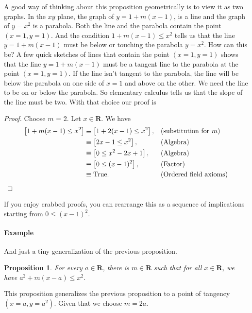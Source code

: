 \documentclass[12pt,fleqn]{article}
\newcommand{\reals}{\mathbf{R}}
\newcommand{\true}{\mathrm{True}}
\newenvironment{myproof}
  {\begin{shaded}\begin{proof}}
  {\end{proof}\end{shaded}}
\newtheorem{prop}{Proposition}
\newcounter{ex}\setcounter{ex}{0}
\newcommand{\ex}{%
\setcounter{ex}{\value{ex}+1}
\paragraph{Example \theex}}
\begin{document}
      A good way of thinking about this proposition geometrically is to view it as two graphs. In the $xy$ plane, the graph of  $y = 1 + m(x-1)$, is a line  and the
      graph of $y = x^2$  is a parabola.   Both the line  and the parabola contain the point $(x=1,y=1)$. And the 
      condition $1 + m(x-1) \leq x^2$ tells
      us that the line $y = 1 + m(x-1)$ must be below or touching the parabola $y=x^2$.  How can this be? A few quick sketches of lines that
      contain the point $(x=1,y=1)$  shows that the line $y = 1 + m(x-1)$ must be a tangent line to the parabola at the point $(x=1,y=1)$.  If 
      the line isn't tangent to the parabola, the line will be below the parabola on one side of $x=1$ and above on the other.   We need the
      line to be on or below the parabola.  So   elementary calculus tells us that the slope of the line must be two. With that choice
      our proof is      
       \begin{myproof} Choose $m$ = 2. Let $x\in \reals$. We have
       \begin{align*}
         \left[1 + m(x-1) \leq x^2  \right] &\equiv \left[1+2(x-1) \leq  x^2 \right], && \text{(substitution for $m$)} \\
                                      &\equiv \left[2x-1 \leq x^2 \right], 
                                       &&\text{(Algebra)} \\
                                    &\equiv \left[0 \leq x^2 -2x+1 \right], 
                                       &&\text{(Algebra)} \\
                                    &\equiv \left[0 \leq (x-1)^2 \right], 
                                       &&\text{(Factor)} \\
                                      &\equiv \true. &&\text{(Ordered field axioms)} \qedhere
       \end{align*}
       \end{myproof}
       \noindent If you enjoy crabbed proofs, you can rearrange this as a sequence of implications starting from $0 \leq (x-1)^2$. 
   
       \ex And just a tiny generalization of the previous proposition.

     \begin{prop} For every $a \in \reals$, there is $m \in \reals$ such 
     that for all $x \in \reals$, we have $a^2 + m(x-a) \leq x^2$.
     \end{prop}
     This proposition generalizes the previous proposition to a point of tangency $(x=a,y=a^2)$. Given that we choose $m=2a$. 
\end{document}
